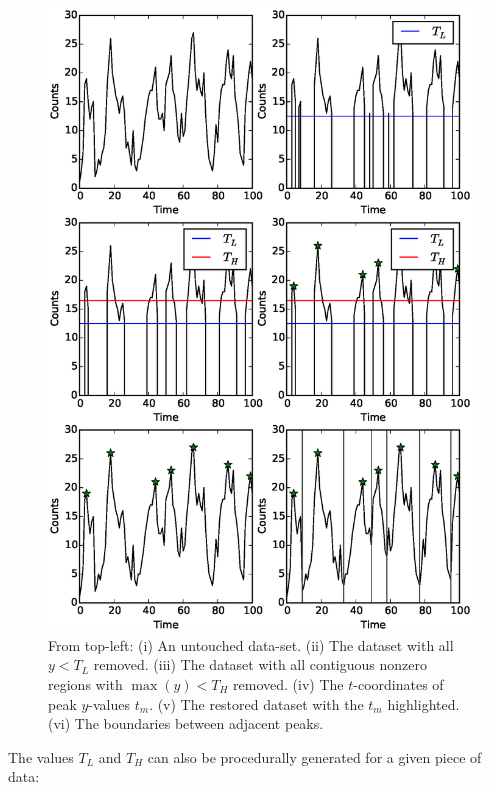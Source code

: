 \begin{figure}
    \includegraphics[width=\columnwidth, trim = 0mm 30mm 0mm 28mm]{images/steps.eps}
    \captionsetup{singlelinecheck=off}
    \caption[A cartoon illustrating the procedure of the algorithm described in Section \ref{sec:Flares}.]{From top-left: (i) An untouched data-set.  (ii) The dataset with all $y<T_L$ removed.  (iii) The dataset with all contiguous nonzero regions with $\max(y)<T_H$ removed.  (iv) The $t$-coordinates of peak $y$-values $t_m$.  (v) The restored dataset with the $t_m$ highlighted.  (vi) The boundaries between adjacent peaks.}
   \label{fig:BurstAlg}
\end{figure}

The values $T_L$ and $T_H$ can also be procedurally generated for a given piece of data:

